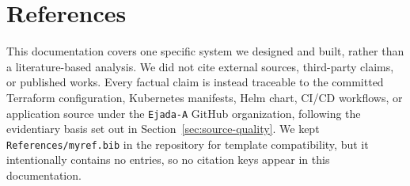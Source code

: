 \label{Bibliography}


\cleardoublepage
{}
{}
\chapter*{References}

This documentation covers one specific system we designed and built, rather than a
literature-based analysis. We did not cite external sources, third-party claims, or
published works. Every factual claim is instead traceable to the committed Terraform
configuration, Kubernetes manifests, Helm chart, CI/CD workflows, or application source
under the \texttt{Ejada-A} GitHub organization, following the evidentiary basis set out
in Section~\ref{sec:source-quality}. We kept \texttt{References/myref.bib} in the
repository for template compatibility, but it intentionally contains no entries, so no
citation keys appear in this documentation.
